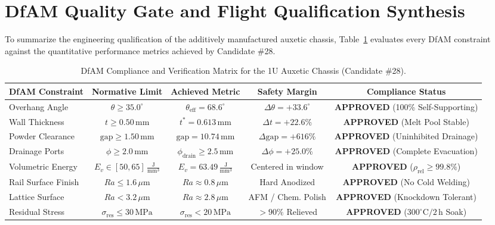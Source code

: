 \section{DfAM Quality Gate and Flight Qualification Synthesis}
\label{sec:dfam_quality_gate}

To summarize the engineering qualification of the additively manufactured auxetic chassis, Table~\ref{tab:dfam_compliance_matrix} evaluates every DfAM constraint against the quantitative performance metrics achieved by Candidate \#28.

\begin{table}[htbp]
\centering
\caption{DfAM Compliance and Verification Matrix for the 1U Auxetic Chassis (Candidate \#28).}
\label{tab:dfam_compliance_matrix}
\begin{adjustbox}{max width=\textwidth}
\begin{tabular}{lcccc}
\toprule
\textbf{DfAM Constraint} & \textbf{Normative Limit} & \textbf{Achieved Metric} & \textbf{Safety Margin} & \textbf{Compliance Status} \\
\midrule
Overhang Angle & $\theta \ge 35.0^\circ$ & $\theta_{\text{eff}} = 68.6^\circ$ & $\Delta \theta = +33.6^\circ$ & \textbf{APPROVED} (100\% Self-Supporting) \\
Wall Thickness & $t \ge 0.50\,\text{mm}$ & $t^* = 0.613\,\text{mm}$ & $\Delta t = +22.6\%$ & \textbf{APPROVED} (Melt Pool Stable) \\
Powder Clearance & $\text{gap} \ge 1.50\,\text{mm}$ & $\text{gap} = 10.74\,\text{mm}$ & $\Delta \text{gap} = +616\%$ & \textbf{APPROVED} (Uninhibited Drainage) \\
Drainage Ports & $\phi \ge 2.0\,\text{mm}$ & $\phi_{\text{drain}} \ge 2.5\,\text{mm}$ & $\Delta \phi = +25.0\%$ & \textbf{APPROVED} (Complete Evacuation) \\
Volumetric Energy & $E_v \in [50, 65]\,\frac{\text{J}}{\text{mm}^3}$ & $E_v = 63.49\,\frac{\text{J}}{\text{mm}^3}$ & Centered in window & \textbf{APPROVED} ($\rho_{\text{rel}} \ge 99.8\%$) \\
Rail Surface Finish & $Ra \le 1.6\,\mu\text{m}$ & $Ra \approx 0.8\,\mu\text{m}$ & Hard Anodized & \textbf{APPROVED} (No Cold Welding) \\
Lattice Surface & $Ra < 3.2\,\mu\text{m}$ & $Ra \approx 2.8\,\mu\text{m}$ & AFM / Chem. Polish & \textbf{APPROVED} (Knockdown Tolerant) \\
Residual Stress & $\sigma_{\text{res}} \le 30\,\text{MPa}$ & $\sigma_{\text{res}} < 20\,\text{MPa}$ & $> 90\%$ Relieved & \textbf{APPROVED} ($300^\circ\text{C} / 2\,\text{h}$ Soak) \\

\end{tabular}
\end{adjustbox}
\end{table}
